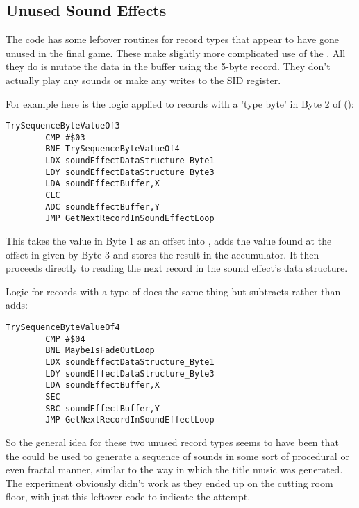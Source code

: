 \subsection{Unused Sound Effects}
The  code has some leftover routines for record types that appear to have gone unused in the final
game. These make slightly more complicated use of the . All they do is mutate the data in the buffer
using the 5-byte record. They don't actually play any sounds or make any writes to the SID register.

For example here is the logic applied to records with a 'type byte' in Byte 2 of ():

\begin{lstlisting}
TrySequenceByteValueOf3   
        CMP #$03
        BNE TrySequenceByteValueOf4
        LDX soundEffectDataStructure_Byte1
        LDY soundEffectDataStructure_Byte3
        LDA soundEffectBuffer,X
        CLC
        ADC soundEffectBuffer,Y
        JMP GetNextRecordInSoundEffectLoop
\end{lstlisting}

This takes the value in Byte 1 as an offset into , adds the value found at the offset in 
given by Byte 3 and stores the result in the  accumulator. It then proceeds directly to reading the next record in the sound
effect's data structure.

Logic for records with a type of  does the same thing but subtracts rather than adds:

\begin{lstlisting}
TrySequenceByteValueOf4   
        CMP #$04
        BNE MaybeIsFadeOutLoop
        LDX soundEffectDataStructure_Byte1
        LDY soundEffectDataStructure_Byte3
        LDA soundEffectBuffer,X
        SEC
        SBC soundEffectBuffer,Y
        JMP GetNextRecordInSoundEffectLoop
\end{lstlisting}

So the general idea for these two unused record types seems to have been that the  could be used to generate
a sequence of sounds in some sort of procedural or even fractal manner, similar to the way in which the title music was generated. The
experiment obviously didn't work as they ended up on the cutting room floor, with just this leftover code to indicate the attempt.


